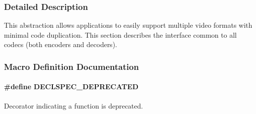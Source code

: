 \subsubsection{Detailed Description}
This abstraction allows applications to easily support multiple video formats with minimal code duplication. This section describes the interface common to all codecs (both encoders and decoders). 

\subsubsection{Macro Definition Documentation}
\hypertarget{group__codec_gab61b56b074706ee8423d864b511212ad}{
\paragraph[{D\-E\-C\-L\-S\-P\-E\-C\-\_\-\-D\-E\-P\-R\-E\-C\-A\-T\-E\-D}]{\setlength{\rightskip}{0pt plus 5cm}\#define D\-E\-C\-L\-S\-P\-E\-C\-\_\-\-D\-E\-P\-R\-E\-C\-A\-T\-E\-D}}\label{group__codec_gab61b56b074706ee8423d864b511212ad}


Decorator indicating a function is deprecated. 

